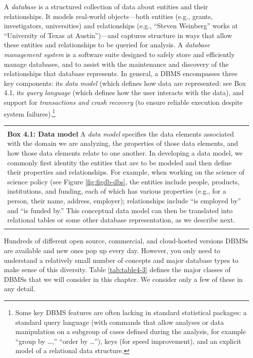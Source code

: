 \documentclass[]{krantz}
\newenvironment{F00}
    {\begin{center}
    \begin{tabular}{|p{0.9\textwidth}|}
    \hline\\
    }
    { 
    \\\\\hline
    \end{tabular} 
    \end{center}
    }
\begin{document}
A \emph{database} is a structured collection of data about entities and
their relationships. It models real-world objects---both entities (e.g.,
grants, investigators, universities) and relationships (e.g., ``Steven
Weinberg'' works at ``University of Texas at Austin'')---and captures
structure in ways that allow these entities and relationships to be
queried for analysis. A \emph{database management system} is a software
suite designed to safely store and efficiently manage databases, and to
assist with the maintenance and discovery of the relationships that
database represents. In general, a DBMS encompasses three key
components: its \emph{data model} (which defines how data are
represented: see Box 4.1, its \emph{query language} (which defines how
the user interacts with the data), and support for \emph{transactions
and crash recovery} (to ensure reliable execution despite system
failures).\footnote{Some key DBMS features are often lacking in standard
  statistical packages: a standard query language (with commands that
  allow analyses or data manipulation on a subgroup of cases defined
  during the analysis, for example ``group by \ldots{},'' ``order by
  \ldots{}''), keys (for speed improvement), and an explicit model of a
  relational data structure.}

\begin{F00}
\textbf{Box 4.1: Data model} A \emph{data model} specifies the data
elements associated with the domain we are analyzing, the properties of
those data elements, and how those data elements relate to one another.
In developing a data model, we commonly first identity the entities that
are to be modeled and then define their properties and relationships.
For example, when working on the science of science policy (see Figure
\ref{fig:figdb-dbs}, the entities include people, products,
institutions, and funding, each of which has various properties (e.g.,
for a person, their name, address, employer); relationships include ``is
employed by'' and ``is funded by.'' This conceptual data model can then
be translated into relational tables or some other database
representation, as we describe next.
\end{F00}

Hundreds of different open source, commercial, and cloud-hosted versions
DBMSs are available and new ones pop up every day. However, you only
need to understand a relatively small number of concepts and major
database types to make sense of this diversity. Table \ref{tab:table4-3}
defines the major classes of DBMSs that we will consider in this
chapter. We consider only a few of these in any detail.
\end{document}
